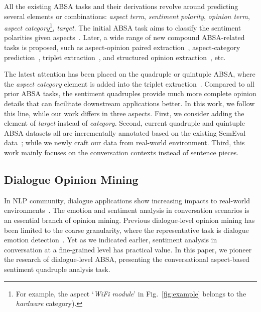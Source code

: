 \documentclass[11pt]{article}
\begin{document}
\vspace{-1mm}
All the existing ABSA tasks and their derivations revolve around predicting several elements or combinations: \emph{aspect term}, \emph{sentiment polarity}, \emph{opinion term}, \emph{aspect category}\footnote{
For example, the aspect `\emph{WiFi module}' in Fig.~\ref{fig:example} belongs to the \textit{hardware} category).
}, \emph{target}.
The initial ABSA task aims to classify the sentiment polarities given aspects~\cite{tang-etal-2016-effective,FanFZ18,li2021unified}.
Later, a wide range of new compound ABSA-related tasks is proposed, such as aspect-opinion paired extraction~\cite{zhao-etal-2020-spanmlt, Wu0RJL21}, aspect-category prediction~\cite{wang-2019-aspect, jiang-etal-2019-challenge, dai-etal-2020-multi}, triplet extraction~\cite{PengXBHLS20, ChenHLSJ21, chen-2022-span}, and structured opinion extraction~\cite{ShiLL0J22,Wu0LZLTJ22}, etc.

The latest attention has been placed on the quadruple or quintuple ABSA, where the \emph{aspect category} element is added into the triplet extraction~\cite{CaiXY20,ZhangD0YBL21,liu-etal-2021-comparative,Feiijcai22UABSA}.
Compared to all prior ABSA tasks, the sentiment quadruples provide much more complete opinion details that can facilitate downstream applications better.
In this work, we follow this line,
while our work differs in three aspects.
First, we consider adding the element of \emph{target} instead of \emph{category}.
Second, current quadruple and quintuple ABSA datasets all are incrementally annotated based on the existing SemEval data~\cite{PontikiGPPAM14, PontikiGPMA15, PontikiGPAMAAZQ16}; while we newly craft our data from real-world environment.
Third, this work mainly focuses on the conversation contexts instead of sentence pieces.

\vspace{-3pt}
\subsection{Dialogue Opinion Mining}

\vspace{-1pt}
In NLP community, dialogue applications show increasing impacts to real-world environments~\cite{LiaoLZHC21,ni2022recent,LiaoTMYHC22}.
The emotion and sentiment analysis in conversation scenarios is an essential branch of opinion mining.
Previous dialogue-level opinion mining has been limited to the coarse granularity, where the representative task is dialogue emotion detection~\cite{li-etal-2020-modeling,hu-etal-2021-dialoguecrn,li-etal-2022-emocaps}.
Yet as we indicated earlier, sentiment analysis in conversation at a fine-grained level has practical value.
In this paper, we pioneer the research of dialogue-level ABSA, presenting the conversational aspect-based sentiment quadruple analysis task. 
\end{document}
